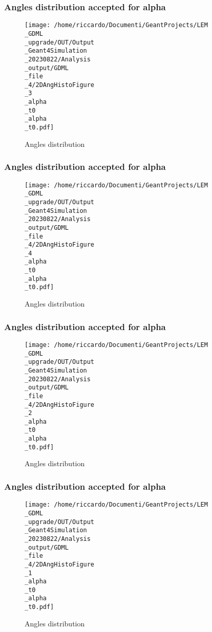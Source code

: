 \documentclass[8pt]{beamer}
\begin{document}
            \begin{frame}
                \frametitle{Angles distribution accepted for alpha}
            
        \begin{figure}[h]
            \centering
            \texttt{[image: /home/riccardo/Documenti/GeantProjects/LEM\\\_GDML\\\_upgrade/OUT/Output\\\_Geant4Simulation\\\_20230822/Analysis\\\_output/GDML\\\_file\\\_4/2DAngHistoFigure\\\_3\\\_alpha\\\_t0\\\_alpha\\\_t0.pdf]}
            \caption{Angles distribution}
        \end{figure}
        
            \end{frame}
            
            \begin{frame}
                \frametitle{Angles distribution accepted for alpha}
            
        \begin{figure}[h]
            \centering
            \texttt{[image: /home/riccardo/Documenti/GeantProjects/LEM\\\_GDML\\\_upgrade/OUT/Output\\\_Geant4Simulation\\\_20230822/Analysis\\\_output/GDML\\\_file\\\_4/2DAngHistoFigure\\\_4\\\_alpha\\\_t0\\\_alpha\\\_t0.pdf]}
            \caption{Angles distribution}
        \end{figure}
        
            \end{frame}
            
            \begin{frame}
                \frametitle{Angles distribution accepted for alpha}
            
        \begin{figure}[h]
            \centering
            \texttt{[image: /home/riccardo/Documenti/GeantProjects/LEM\\\_GDML\\\_upgrade/OUT/Output\\\_Geant4Simulation\\\_20230822/Analysis\\\_output/GDML\\\_file\\\_4/2DAngHistoFigure\\\_2\\\_alpha\\\_t0\\\_alpha\\\_t0.pdf]}
            \caption{Angles distribution}
        \end{figure}
        
            \end{frame}
            
            \begin{frame}
                \frametitle{Angles distribution accepted for alpha}
            
        \begin{figure}[h]
            \centering
            \texttt{[image: /home/riccardo/Documenti/GeantProjects/LEM\\\_GDML\\\_upgrade/OUT/Output\\\_Geant4Simulation\\\_20230822/Analysis\\\_output/GDML\\\_file\\\_4/2DAngHistoFigure\\\_1\\\_alpha\\\_t0\\\_alpha\\\_t0.pdf]}
            \caption{Angles distribution}
        \end{figure}
        
            \end{frame}
            
\end{document}
